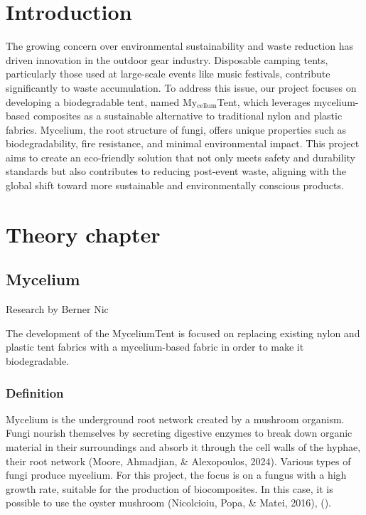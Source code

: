 \documentclass{article}
\begin{document}
\tableofcontents
\thispagestyle{empty}

\newpage
\section{Introduction}
The growing concern over environmental sustainability and waste reduction has driven
innovation in the outdoor gear industry. Disposable camping tents, particularly those used
at large-scale events like music festivals, contribute significantly to waste accumulation.
To address this issue, our project focuses on developing a biodegradable tent, named
My$_{\text{celium}}$Tent, which leverages mycelium-based composites as a sustainable
alternative to traditional nylon and plastic fabrics. Mycelium, the root structure of
fungi, offers unique properties such as biodegradability, fire resistance, and minimal
environmental impact. This project aims to create an eco-friendly solution that not only
meets safety and durability standards but also contributes to reducing post-event waste,
aligning with the global shift toward more sustainable and environmentally conscious
products.

\section{Theory chapter}
\subsection{Mycelium}
{\small Research by Berner Nic}

The development of the MyceliumTent is focused on replacing existing
nylon and plastic tent fabrics with a mycelium-based fabric in order
to make it biodegradable.

\subsubsection{Definition}
Mycelium is the underground root network created by a mushroom
organism. Fungi nourish themselves by secreting digestive enzymes to
break down organic material in their surroundings and absorb it
through the cell walls of the hyphae, their root network
(Moore, Ahmadjian, \& Alexopoulos, 2024). Various types of fungi
produce mycelium. For this project, the focus is on a fungus with a
high growth rate, suitable for the production of biocomposites. In
this case, it is possible to use the oyster mushroom
(Nicolcioiu, Popa, \& Matei, 2016), (\cite{alexopoulos2024}).
\end{document}
